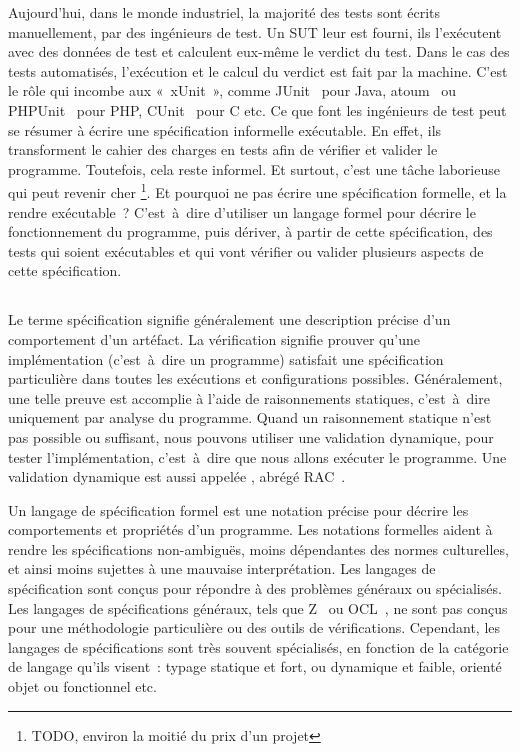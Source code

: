 Aujourd'hui, dans le monde industriel, la majorité des tests sont écrits
{\strong manuellement}, par des ingénieurs de test. Un SUT leur est fourni, ils
l'exécutent avec des données de test et calculent eux-même le verdict du test.
Dans le cas des tests {\strong automatisés}, l'exécution et le calcul du verdict
est fait par la machine. C'est le rôle qui incombe aux 
«~xUnit~», comme JUnit~ pour Java, atoum~ ou
PHPUnit~ pour PHP, CUnit~ pour C etc. Ce que font
les ingénieurs de test peut se résumer à écrire une spécification informelle
exécutable. En effet, ils transforment le cahier des charges en tests afin de
vérifier et valider le programme. Toutefois, cela reste informel. Et surtout,
c'est une tâche laborieuse qui peut revenir cher \footnote{TODO, environ la
moitié du prix d'un projet}. Et pourquoi ne pas écrire une spécification
formelle, et la rendre exécutable~?  C'est~à~dire d'utiliser un langage formel
pour décrire le fonctionnement du programme, puis dériver, à partir de cette
spécification, des tests qui soient exécutables et qui vont vérifier ou valider
plusieurs aspects de cette spécification.

\subsection{}

Le terme {\strong spécification} signifie généralement une description précise
d'un comportement d'un artéfact. La {\strong vérification} signifie prouver
qu'une implémentation (c'est~à~dire un programme) satisfait une spécification
particulière dans toutes les exécutions et configurations possibles.
Généralement, une telle preuve est accomplie à l'aide de raisonnements
statiques, c'est~à~dire uniquement par analyse du programme. Quand un
raisonnement statique n'est pas possible ou suffisant, nous pouvons utiliser une
{\strong validation} dynamique, pour tester l'implémentation, c'est~à~dire que
nous allons exécuter le programme. Une validation dynamique est aussi appelée
, abrégé RAC~.

Un {\strong langage de spécification} formel est une notation précise pour
décrire les comportements et propriétés d'un programme. Les {\strong notations
formelles} aident à rendre les spécifications non-ambiguës, moins dépendantes
des normes culturelles, et ainsi moins sujettes à une mauvaise interprétation.
Les langages de spécification sont conçus pour répondre à des problèmes généraux
ou spécialisés. Les langages de spécifications généraux, tels que
Z~ ou OCL~, ne sont pas conçus pour une
méthodologie particulière ou des outils de vérifications. Cependant, les
langages de spécifications sont très souvent spécialisés, en fonction de la
catégorie de langage qu'ils visent~: typage statique et fort, ou dynamique et
faible, orienté objet ou fonctionnel etc.


